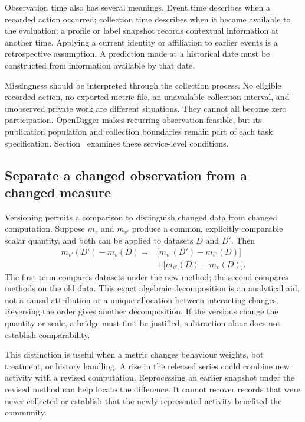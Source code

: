 Observation time also has several meanings. Event time describes when a recorded action occurred; collection time describes when it became available to the evaluation; a profile or label snapshot records contextual information at another time. Applying a current identity or affiliation to earlier events is a retrospective assumption. A prediction made at a historical date must be constructed from information available by that date.

Missingness should be interpreted through the collection process. No eligible recorded action, no exported metric file, an unavailable collection interval, and unobserved private work are different situations. They cannot all become zero participation. OpenDigger makes recurring observation feasible, but its publication population and collection boundaries remain part of each task specification. Section~ examines these service-level conditions.

\subsection{Separate a changed observation from a changed measure}
Versioning permits a comparison to distinguish changed data from changed computation. Suppose \(m_v\) and \(m_{v'}\) produce a common, explicitly comparable scalar quantity, and both can be applied to datasets \(D\) and \(D'\). Then
\begin{equation}
\begin{split}
m_{v'}(D')-m_v(D)
={}&\bigl[m_{v'}(D')-m_{v'}(D)\bigr]\\
 &+\bigl[m_{v'}(D)-m_v(D)\bigr].
\end{split}
\label{eq:ch3-version}
\end{equation}
The first term compares datasets under the new method; the second compares methods on the old data. This exact algebraic decomposition is an analytical aid, not a causal attribution or a unique allocation between interacting changes. Reversing the order gives another decomposition. If the versions change the quantity or scale, a bridge must first be justified; subtraction alone does not establish comparability.

This distinction is useful when a metric changes behaviour weights, bot treatment, or history handling. A rise in the released series could combine new activity with a revised computation. Reprocessing an earlier snapshot under the revised method can help locate the difference. It cannot recover records that were never collected or establish that the newly represented activity benefited the community.

